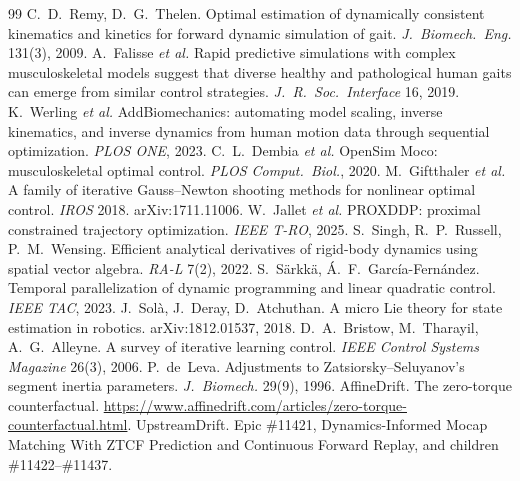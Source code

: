 \documentclass[11pt,a4paper]{article}
\begin{document}
\begin{thebibliography}{99}
 C.~D.~Remy, D.~G.~Thelen. Optimal estimation of dynamically consistent kinematics and kinetics for forward dynamic simulation of gait. \emph{J.~Biomech.\ Eng.} 131(3), 2009.
 A.~Falisse \emph{et al.} Rapid predictive simulations with complex musculoskeletal models suggest that diverse healthy and pathological human gaits can emerge from similar control strategies. \emph{J.~R.~Soc.\ Interface} 16, 2019.
 K.~Werling \emph{et al.} AddBiomechanics: automating model scaling, inverse kinematics, and inverse dynamics from human motion data through sequential optimization. \emph{PLOS ONE}, 2023.
 C.~L.~Dembia \emph{et al.} OpenSim Moco: musculoskeletal optimal control. \emph{PLOS Comput.\ Biol.}, 2020.
 M.~Giftthaler \emph{et al.} A family of iterative Gauss--Newton shooting methods for nonlinear optimal control. \emph{IROS} 2018. arXiv:1711.11006.
 W.~Jallet \emph{et al.} PROXDDP: proximal constrained trajectory optimization. \emph{IEEE T-RO}, 2025.
 S.~Singh, R.~P.~Russell, P.~M.~Wensing. Efficient analytical derivatives of rigid-body dynamics using spatial vector algebra. \emph{RA-L} 7(2), 2022.
 S.~S\"arkk\"a, \'A.~F.~Garc\'ia-Fern\'andez. Temporal parallelization of dynamic programming and linear quadratic control. \emph{IEEE TAC}, 2023.
 J.~Sol\`a, J.~Deray, D.~Atchuthan. A micro Lie theory for state estimation in robotics. arXiv:1812.01537, 2018.
 D.~A.~Bristow, M.~Tharayil, A.~G.~Alleyne. A survey of iterative learning control. \emph{IEEE Control Systems Magazine} 26(3), 2006.
 P.~de~Leva. Adjustments to Zatsiorsky--Seluyanov's segment inertia parameters. \emph{J.~Biomech.} 29(9), 1996.
 AffineDrift. The zero-torque counterfactual. \url{https://www.affinedrift.com/articles/zero-torque-counterfactual.html}.
 UpstreamDrift. Epic \#11421, Dynamics-Informed Mocap Matching With ZTCF Prediction and Continuous Forward Replay, and children \#11422--\#11437.
\end{thebibliography}
\end{document}
